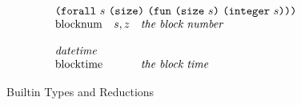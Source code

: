 \documentclass[../main.tex]{subfiles}
\begin{document}
\begin{figure*}[t]
\[\begin{array}{lll}
        \multicolumn{3}{l}{\forallT{s}{\sizeK{}}{\funT{\sizeT{s}}{\integerT{s}}}}\\
        \mathrm{blocknum} & s, z & \textit{the block number}\\
        &&\\
        
        \multicolumn{3}{l}{\mathit{datetime}}\\
        \mathrm{blocktime} & & \textit{the block time}\\
    \end{array}\]
    \normalsize
    \caption{Builtin Types and Reductions}
    \label{fig:Plutus_core_builtins}
\end{figure*}
\end{document}
